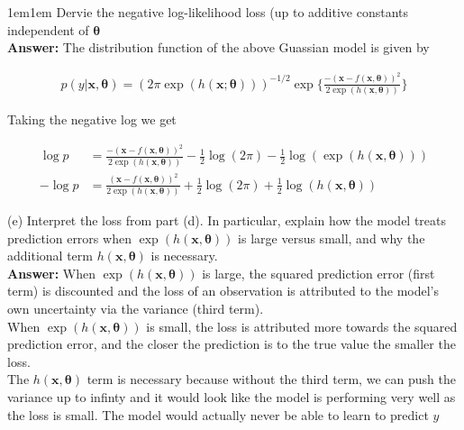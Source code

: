 \documentclass[11pt]{article}
\begin{document}
\begin{adjustwidth}{1em}{1em}
        Dervie the negative log-likelihood loss (up to additive constants independent of
        $\boldsymbol{\theta}$ \\ 

        \textbf{Answer:} The distribution function of the above Guassian model is given by 

        \begin{align*}
            p(y | \mathbf{x}, \boldsymbol{\theta}) =
            (2\pi\exp(h(\mathbf{x};\boldsymbol{\theta})))^{-1/2} \exp \bigg\{\frac{-(\mathbf{x} -
            f(\mathbf{x}, \boldsymbol{\theta}))^2}{2\exp(h(\mathbf{x}, \boldsymbol{\theta}))}\bigg\}
        \end{align*}

        Taking the negative log we get 

        \begin{align*}
            \log p 
            &= \frac{-(\mathbf{x} - f(\mathbf{x}, \boldsymbol{\theta}))^2}{2\exp(h(\mathbf{x},
            \boldsymbol{\theta}))} - \frac{1}{2}\log(2\pi) - \frac{1}{2}\log(\exp(h(\mathbf{x},
            \boldsymbol{\theta}))) \\ 
            -\log p 
            &= \frac{(\mathbf{x} - f(\mathbf{x}, \boldsymbol{\theta}))^2}{2\exp(h(\mathbf{x},
            \boldsymbol{\theta}))} + \frac{1}{2}\log(2\pi) + \frac{1}{2}\log(h(\mathbf{x},
            \boldsymbol{\theta}))
        \end{align*}

        (e) Interpret the loss from part (d). In particular, explain how the model treats
        prediction errors when $\exp(h(\mathbf{x}, \boldsymbol{\theta}))$ is large versus small, and
        why the additional term $h(\mathbf{x}, \boldsymbol{\theta})$ is necessary. \\ 

        \textbf{Answer:} When $\exp(h(\mathbf{x}, \boldsymbol{\theta}))$ is large, the squared
        prediction error (first term) is discounted and the loss of an observation is attributed to
        the model's own uncertainty via the variance (third term). \\

        When $\exp(h(\mathbf{x}, \boldsymbol{\theta}))$ is small, the loss is attributed more
        towards the squared prediction error, and the closer the prediction is to the true value the
        smaller the loss. \\ 

        The $h(\mathbf{x}, \boldsymbol{\theta})$ term is necessary because without the third term,
        we can push the variance up to infinty and it would look like the model is performing very
        well as the loss is small. The model would actually never be able to learn to predict $y$ 
        \\ 
    \end{adjustwidth}
\end{document}
